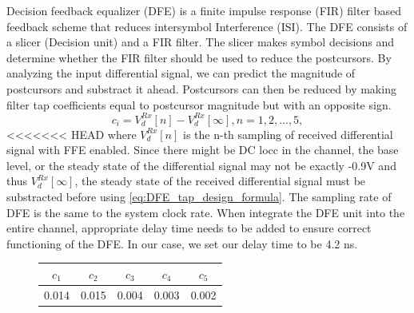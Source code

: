 \documentclass{book}  %
\renewcommand{\section}[1]{\psection{#1}}
\begin{document}
\begin{paper}
\section{Decision Feedback Equalizer}
Decision feedback equalizer (DFE) is a finite impulse response (FIR) filter based feedback scheme that reduces intersymbol Interference (ISI). The DFE consists of a slicer (Decision unit) and a FIR filter. The slicer makes symbol decisions and determine whether the FIR filter should be used to reduce the postcursors. By analyzing the input differential signal, we can predict the magnitude of postcursors and substract it ahead. Postcursors can then be reduced by making filter tap coefficients equal to postcursor magnitude but with an opposite sign.  
%
\begin{equation}
c_i = V_d^{Rx}[n] - V_d^{Rx}[\infty], n=1,2,...,5,
\label{eq:DFE_tap_design_formula}
\end{equation}
%
<<<<<<< HEAD
where $V_d^{Rx}[n]$ is the n-th sampling of received differential signal with FFE enabled. Since there might be DC locc in the channel, the base level, or the steady state of the differential signal may not be exactly -0.9V and thus $V_d^{Rx}[\infty]$, the steady state of the received differential signal must be substracted before using \ref{eq:DFE_tap_design_formula}. The sampling rate of DFE is the same to the system clock rate. When integrate the DFE unit into the entire channel, appropriate delay time needs to be added to ensure correct functioning of the DFE. In our case, we set our delay time to be 4.2 ns. 


\begin{figure}
	\centering	
	\begin{minipage}[tb]{\textwidth}
		\centering	
		\begin{tabular}{|c|c|c|c|c|}\hline
			$c_{1}$ &  $c_{2}$ &  $c_{3}$ &  $c_{4}$ &  $c_{5}$ \\ \hline 
			0.014 &    0.015 &    0.004 &    0.003 &    0.002 \\ \hline 
		\end{tabular}
		\label{table:3G_DFE_coeff}
	\end{minipage}%
	

\end{figure}
\end{paper}
\end{document}
